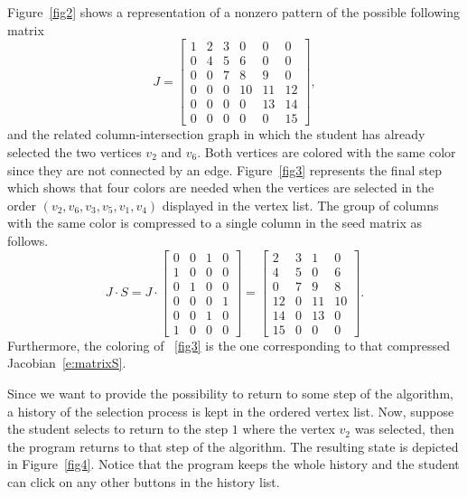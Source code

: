 \documentclass[12pt, twoside,a4paper,toc=bibliography]{scrbook}
\newcommand{\figref}[1]{Figure~\protect\ref{#1}}
\begin{document}
\figref{fig2} shows a representation of a nonzero pattern of the possible following matrix
\begin{equation}
\label{e:matrixJ}
J =
\begin{bmatrix}
1 & 2 & 3 & 0 & 0 & 0 \\
0 & 4 & 5 & 6 & 0 & 0 \\
0 & 0 & 7 & 8 & 9 & 0\\
0 & 0 & 0 & 10 & 11 & 12\\
0 & 0 & 0 & 0 & 13 & 14 \\
0 & 0 & 0 & 0 & 0 & 15
\end{bmatrix},
\end{equation}
and the related column-intersection graph in which the student has already selected the two vertices $v_2$ and $v_6$. Both vertices are colored with the same color since they are not connected by an edge. \figref{fig3} represents the final step which shows that four colors are needed when the vertices are selected in the order $(v_2, v_6, v_3, v_5, v_1, v_4)$ displayed in the vertex list. The group of columns with the same color is compressed to a single column in the seed matrix as follows.
\begin{equation}
\label{e:matrixS}
J \cdot S =
J \cdot
\begin{bmatrix}
 0  & 0 & 1 & 0 \\
 1  & 0 & 0 & 0 \\
 0  & 1 & 0 & 0 \\
 0  & 0 & 0 & 1 \\
 0  & 0 & 1 & 0 \\
 1  & 0 & 0 & 0
\end{bmatrix}
=
\begin{bmatrix}
2 & 3 & 1 & 0 \\
4 & 5 & 0 & 6 \\
0 & 7 & 9 & 8 \\
12 & 0 & 11 & 10\\
14 & 0 & 13 & 0 \\
15 & 0 & 0 & 0
\end{bmatrix}.
\end{equation}
Furthermore, the coloring of \figurename~\ref{fig3} is the one corresponding to that compressed Jacobian~\eqref{e:matrixS}.

Since we want to provide the possibility to return to some step of the algorithm, a history of the selection process is kept in the ordered vertex list. Now, suppose the student selects to return to the step $1$ where the vertex $v_2$ was selected, then the program returns to that step of the algorithm. The resulting state is depicted in \figref{fig4}. Notice that the program keeps the whole history and the student can click on any other buttons in the history list.
\end{document}
